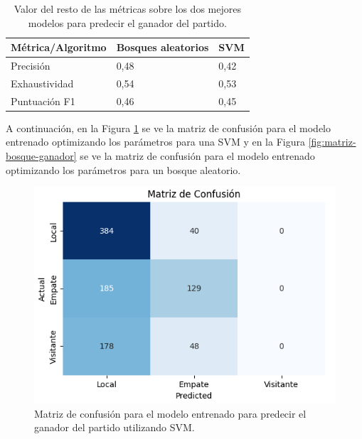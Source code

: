 \begin{table}[]
    \centering
    \begin{tabular}{|l|l|l|}
        \hline
        \rowcolor[HTML]{C0C0C0}
        Métrica/Algoritmo   & Bosques aleatorios & SVM  \\ \hline
        Precisión & 0,48               & 0,42 \\ \hline
        Exhaustividad    & 0,54               & 0,53 \\ \hline
        Puntuación F1  & 0,46               & 0,45 \\ \hline
    \end{tabular}
    \caption{Valor del resto de las métricas sobre los dos mejores modelos para predecir el ganador del partido.}
    \label{table:resto-metricas-ganador}
\end{table}

A continuación, en la Figura \ref{fig:matriz-svm-ganador} se ve la matriz de confusión para el modelo entrenado optimizando los parámetros para una SVM y en la Figura \ref{fig:matriz-bosque-ganador} se ve la matriz de confusión para el modelo entrenado optimizando los parámetros para un bosque aleatorio.

\begin{figure}[H]
    \centering
    \includegraphics[scale=0.60]{svg/matriz-svm-ganador.png}
    \caption{Matriz de confusión para el modelo entrenado para predecir el ganador del partido utilizando SVM. }
    \label{fig:matriz-svm-ganador}
\end{figure}

